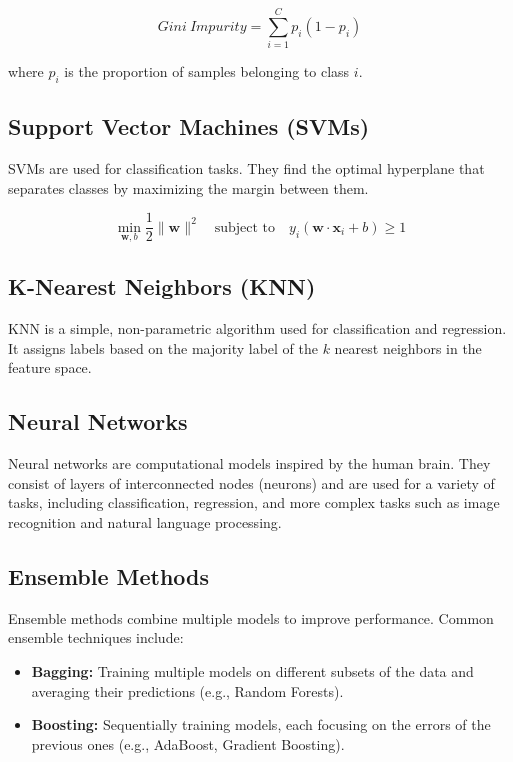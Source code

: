 \begin{equation}
Gini\ Impurity = \sum_{i=1}^{C} p_i (1 - p_i)
\end{equation}

where \( p_i \) is the proportion of samples belonging to class \( i \).

\subsection{Support Vector Machines (SVMs)}
SVMs are used for classification tasks. They find the optimal hyperplane that separates classes by maximizing the margin between them.

\begin{equation}
\min_{\mathbf{w}, b} \frac{1}{2} \| \mathbf{w} \|^2 \quad \text{subject to} \quad y_i (\mathbf{w} \cdot \mathbf{x}_i + b) \geq 1
\end{equation}

\subsection{K-Nearest Neighbors (KNN)}
KNN is a simple, non-parametric algorithm used for classification and regression. It assigns labels based on the majority label of the \( k \) nearest neighbors in the feature space.

\subsection{Neural Networks}
Neural networks are computational models inspired by the human brain. They consist of layers of interconnected nodes (neurons) and are used for a variety of tasks, including classification, regression, and more complex tasks such as image recognition and natural language processing.

\subsection{Ensemble Methods}
Ensemble methods combine multiple models to improve performance. Common ensemble techniques include:

\begin{itemize}
    \item \textbf{Bagging:} Training multiple models on different subsets of the data and averaging their predictions (e.g., Random Forests).
    \item \textbf{Boosting:} Sequentially training models, each focusing on the errors of the previous ones (e.g., AdaBoost, Gradient Boosting).
\end{itemize}

